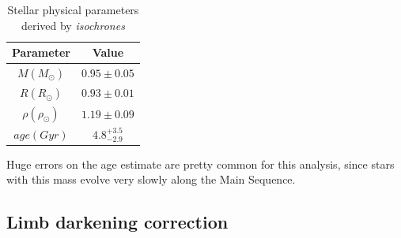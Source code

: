 \documentclass{aa}
\begin{document}
\begin{table}[h!]
\centering
    \begin{tabular}{cc}
    \hline
    Parameter & Value \\
    \hline
     $M (M_{\odot})$ &  $0.95\pm0.05$ \\
     $R (R_{\odot})$ & $0.93 \pm 0.01$  \\
     $\rho (\rho_{\odot})$ & $1.19 \pm 0.09$ \\
     $age (Gyr)$  & $4.8^{+3.5}_{-2.9}$ \\
    \hline
    \end{tabular}
\caption{Stellar physical parameters derived by \textit{isochrones}}
\label{table:b}
\end{table}
Huge errors on the age estimate are pretty common for this analysis, since 
stars with this mass evolve very slowly along the Main Sequence. 



\subsection{Limb darkening correction}
\end{document}
